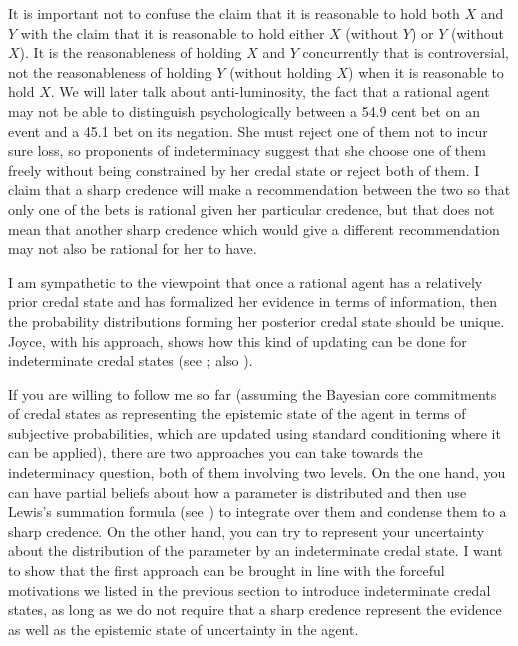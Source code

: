 \documentclass[11pt]{article}
\begin{document}
It is important not to confuse the claim that it is reasonable to hold
both $X$ and $Y$ with the claim that it is reasonable to hold either
$X$ (without $Y$) or $Y$ (without $X$). It is the reasonableness of
holding $X$ and $Y$ concurrently that is controversial, not the
reasonableness of holding $Y$ (without holding $X$) when it is
reasonable to hold $X$. We will later talk about anti-luminosity, the
fact that a rational agent may not be able to distinguish
psychologically between a 54.9 cent bet on an event and a 45.1 bet on
its negation. She must reject one of them not to incur sure loss, so
proponents of indeterminacy suggest that she choose one of them freely
without being constrained by her credal state or reject both of them.
I claim that a sharp credence will make a recommendation between the
two so that only one of the bets is rational given her particular
credence, but that does not mean that another sharp credence which
would give a different recommendation may not also be rational for her
to have.

I am sympathetic to the viewpoint that once a rational agent has a
relatively prior credal state and has formalized her evidence in terms
of information, then the probability distributions forming her
posterior credal state should be unique. Joyce, with his
 approach, shows how this kind of updating can
be done for indeterminate credal states (see ;
also ).

If you are willing to follow me so far (assuming the Bayesian core
commitments of credal states as representing the epistemic state of
the agent in terms of subjective probabilities, which are updated
using standard conditioning where it can be applied), there are two
approaches you can take towards the indeterminacy question, both of
them involving two levels. On the one hand, you can have partial
beliefs about how a parameter is distributed and then use Lewis's
summation formula (see ) to integrate over
them and condense them to a sharp credence. On the other hand, you can
try to represent your uncertainty about the distribution of the
parameter by an indeterminate credal state. I want to show that the
first approach can be brought in line with the forceful motivations we
listed in the previous section to introduce indeterminate credal
states, as long as we do not require that a sharp credence represent
the evidence as well as the epistemic state of uncertainty in the
agent.
\end{document}
